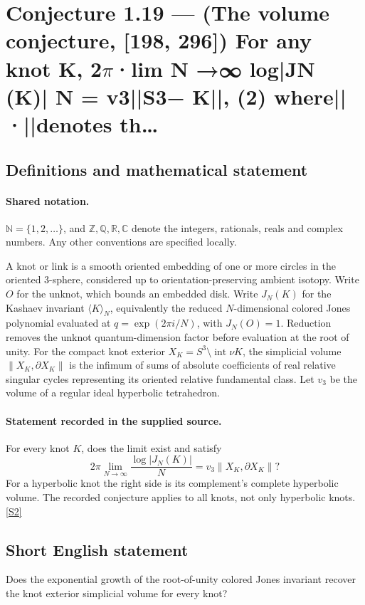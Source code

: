 \documentclass[11pt]{article}
\newcommand{\sref}[2]{\hyperlink{source:#1:#2}{[S#2]}}
\begin{document}
\section{Conjecture 1.19 — (The volume conjecture, [198, 296]) For any knot K, 2\texorpdfstring{$\pi$}{pi}·lim N →∞ log|JN (K)| N = v3||S3− K||, (2) where||·||denotes th…}\label{statement}

\subsection{Definitions and mathematical statement}

\paragraph{Shared notation.}$\mathbb N=\{1,2,\ldots\}$, and $\mathbb Z,\mathbb Q,\mathbb R,\mathbb C$ denote the integers, rationals, reals and complex numbers. Any other conventions are specified locally.


A knot or link is a smooth oriented embedding of one or more circles in the oriented $3$-sphere, considered up to orientation-preserving ambient isotopy. Write $O$ for the unknot, which bounds an embedded disk. Write $J_N(K)$ for the Kashaev invariant $\langle K\rangle_N$, equivalently the reduced $N$-dimensional colored Jones polynomial evaluated at $q=\exp(2\pi i/N)$, with $J_N(O)=1$. Reduction removes the unknot quantum-dimension factor before evaluation at the root of unity. For the compact knot exterior $X_K=S^3\setminus\operatorname{int}\nu K$, the simplicial volume $\|X_K,\partial X_K\|$ is the infimum of sums of absolute coefficients of real relative singular cycles representing its oriented relative fundamental class. Let $v_3$ be the volume of a regular ideal hyperbolic tetrahedron.
\paragraph{Statement recorded in the supplied source.}
For every knot $K$, does the limit exist and satisfy
\[2\pi\lim_{N\to\infty}\frac{\log|J_N(K)|}{N}
=v_3\|X_K,\partial X_K\|?\]
For a hyperbolic knot the right side is its complement's complete hyperbolic volume. The recorded conjecture applies to all knots, not only hyperbolic knots. \sref{statement}{2}
\subsection{Short English statement}
Does the exponential growth of the root-of-unity colored Jones invariant recover the knot exterior simplicial volume for every knot?
\end{document}
